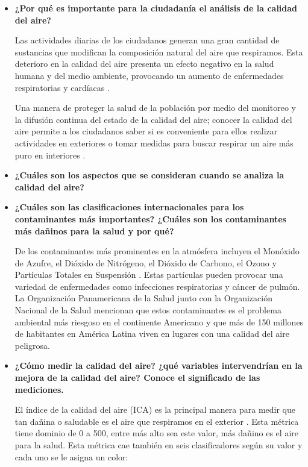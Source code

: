 \documentclass[10pt]{article}
\begin{document}
    \begin{itemize}
        \item \textbf{¿Por qué es importante para la ciudadanía el análisis de la calidad del aire?}

        Las actividades diarias de los ciudadanos generan una gran cantidad de sustancias que modifican la composición natural del aire que respiramos. Esta deterioro en la calidad del aire presenta un efecto negativo en la salud humana y del medio ambiente, provocando un aumento de enfermedades respiratorias y cardíacas \cite{sirae}.

        Una manera de proteger la salud de la población por medio del monitoreo y la difusión continua del estado de la calidad del aire; conocer la calidad del aire permite a los ciudadanos saber si es conveniente para ellos realizar actividades en exteriores o tomar medidas para buscar respirar un aire más puro en interiores \cite{sirae}.

        \item \textbf{¿Cuáles son los aspectos que se consideran cuando se analiza la calidad del aire?}

        \item \textbf{¿Cuáles son las clasificaciones internacionales para los contaminantes más importantes? ¿Cuáles son los contaminantes más dañinos para la salud y por qué?}

                De los contaminantes más prominentes en la atmósfera incluyen el Monóxido de Azufre, el Dióxido de Nitrógeno, el Dióxido de Carbono, el Ozono y Partículas Totales en Suspensión \cite{aquae}. Estas partículas pueden provocar una variedad de enfermedades como infecciones respiratorias y cáncer de pulmón. La Organización Panamericana de la Salud junto con la Organización Nacional de la Salud mencionan que estos contaminantes es el problema ambiental más riesgoso en el continente Americano \cite{ops} y que más de 150 millones de habitantes en América Latina viven en lugares con una calidad del aire peligrosa.

        \item \textbf{¿Cómo medir la calidad del aire? ¿qué variables intervendrían en la mejora de la calidad del aire? Conoce el significado de las mediciones.}

            El índice de la calidad del aire (ICA) es la principal manera para medir que tan dañina o saludable es el aire que respiramos en el exterior \cite{aquae}. Esta métrica tiene dominio de 0 a 500, entre más alto sea este valor, más dañino es el aire para la salud. Esta métrica cae también en seis clasificadores según su valor y cada uno se le asigna un color:


\end{itemize}
\end{document}

